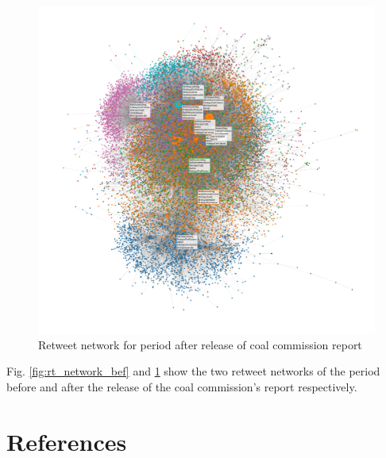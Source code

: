 \documentclass[10pt,twocolumn,twoside]{layout}
\begin{document}
\begin{figure} 
	\begin{center}
		\includegraphics[width=\linewidth]{figures/rt_network_ht_period3}
	\end{center}
	\caption{Retweet network for period after release of coal commission report}
	\label{fig:rt_network_aft}
\end{figure}

Fig. \ref{fig:rt_network_bef} and \ref{fig:rt_network_aft} show the two retweet networks of the period before and after the release of the coal commission's report respectively. 



\section*{References}

\end{document}
